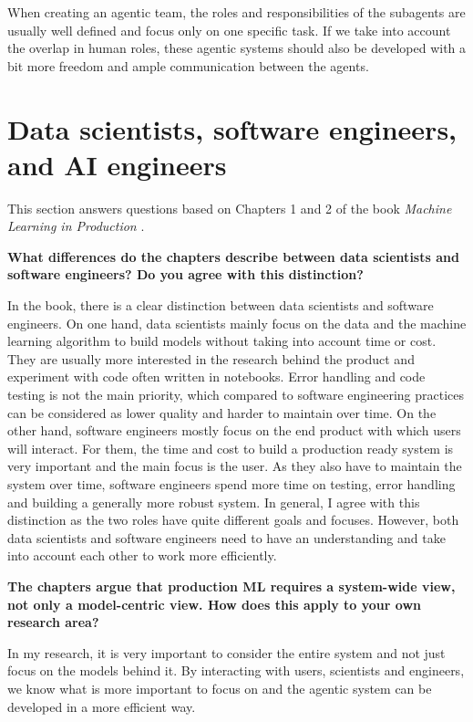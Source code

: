 \documentclass[11pt]{article}
\begin{document}
When creating an agentic team, the roles and responsibilities of the subagents are usually well defined and focus only on one specific task. If we take into account the overlap in human roles, these agentic systems should also be developed with a bit more freedom and ample communication between the agents.


\section{Data scientists, software engineers, and AI engineers}

This section answers questions based on Chapters 1 and 2 of the book \textit{Machine Learning in Production} \cite{kastner2025machine}.

\textbf{What differences do the chapters describe between data scientists and software engineers? Do you agree with this distinction?}

In the book, there is a clear distinction between data scientists and software engineers. 
On one hand, data scientists mainly focus on the data and the machine learning algorithm to build models without taking into account time or cost. They are usually more interested in the research behind the product and experiment with code often written in notebooks. Error handling and code testing is not the main priority, which compared to software engineering practices can be considered as lower quality and harder to maintain over time.
On the other hand, software engineers mostly focus on the end product with which users will interact. For them, the time and cost to build a production ready system is very important and the main focus is the user. As they also have to maintain the system over time, software engineers spend more time on testing, error handling and building a generally more robust system.
In general, I agree with this distinction as the two roles have quite different goals and focuses. However, both data scientists and software engineers need to have an understanding and take into account each other to work more efficiently.

\textbf{The chapters argue that production ML requires a system-wide view, not only a model-centric view. How does this apply to your own research area?}

In my research, it is very important to consider the entire system and not just focus on the models behind it. By interacting with users, scientists and engineers, we know what is more important to focus on and the agentic system can be developed in a more efficient way.
\end{document}
